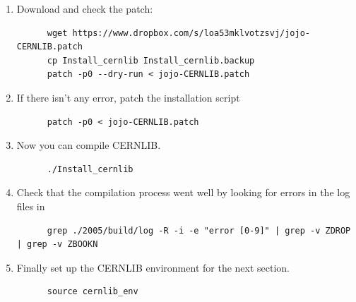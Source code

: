\begin{enumerate}[resume]
  
\item Download and check the patch:
\begin{lstlisting}
      wget https://www.dropbox.com/s/loa53mklvotzsvj/jojo-CERNLIB.patch
      cp Install_cernlib Install_cernlib.backup
      patch -p0 --dry-run < jojo-CERNLIB.patch
\end{lstlisting}
\item If there isn’t any error, patch the installation script
\begin{lstlisting}
      patch -p0 < jojo-CERNLIB.patch
\end{lstlisting}
\item Now you can compile CERNLIB.\@
\begin{lstlisting}
      ./Install_cernlib
\end{lstlisting}
\item Check that the compilation process went well by looking for errors in the
  log files in 
\begin{lstlisting}
      grep ./2005/build/log -R -i -e "error [0-9]" | grep -v ZDROP | grep -v ZBOOKN
\end{lstlisting}
\item Finally set up the CERNLIB environment for the next section.
\begin{lstlisting}
      source cernlib_env
\end{lstlisting}
\end{enumerate}


